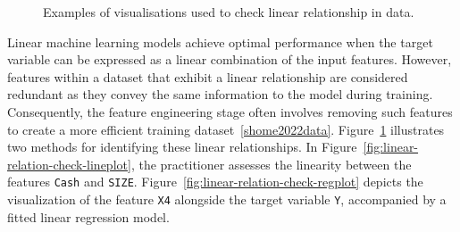\begin{figure}
\centering
{}
\caption{Examples of visualisations used to check linear relationship in data.}
\label{fig:linear-relation-check}
\end{figure}

Linear machine learning models achieve optimal performance when the target variable can be expressed as a linear combination of the input features. However, features within a dataset that exhibit a linear relationship are considered redundant as they convey the same information to the model during training. Consequently, the feature engineering stage often involves removing such features to create a more efficient training dataset~\ref{shome2022data}. Figure~\ref{fig:linear-relation-check} illustrates two methods for identifying these linear relationships. In Figure~\ref{fig:linear-relation-check-lineplot}, the practitioner assesses the linearity between the features \texttt{Cash} and \texttt{SIZE}. Figure~\ref{fig:linear-relation-check-regplot} depicts the visualization of the feature \texttt{X4} alongside the target variable \texttt{Y}, accompanied by a fitted linear regression model.

